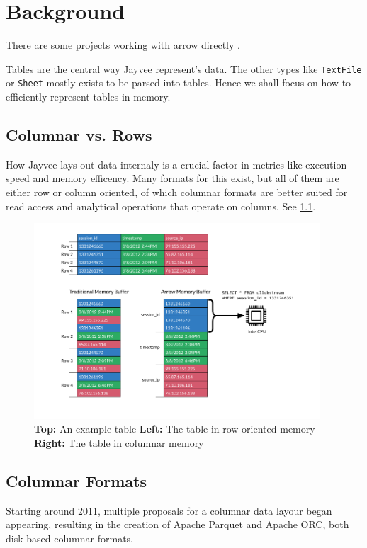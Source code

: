 \chapter{Background}
\label{chapter:Literature}

There are some projects working with arrow directly
\autocite{Ahmad2020}
\autocite{Peltenburg2021}
\autocite{Grossman2022}. %

Tables are the central way Jayvee represent's data.
The other types like \Verb|TextFile| or \Verb|Sheet| mostly exists to be parsed into tables.
Hence %
we shall focus on how to efficiently represent tables in memory.

\section{Columnar vs. Rows}
\label{section:column_vs_row}
How Jayvee lays out data internaly is a crucial factor in metrics like execution speed and memory efficency.
Many formats for this exist, but all of them are either row or column oriented, of which columnar formats are better suited for read access and analytical operations that operate on columns. \autocite{Floratou2019}
See \ref{fig:row_v_col}.
\begin{figure}
	\begin{center}
		\includegraphics[width=0.95\textwidth]{resources/columnar}
	\end{center}
	\caption{\textbf{Top:} An example table \textbf{Left:} The table in row oriented memory \textbf{Right:} The table in columnar memory}
	\label{fig:row_v_col}
\end{figure}


\section{Columnar Formats}
\label{section:columnar}
Starting around 2011, multiple proposals for a columnar data layour began appearing, resulting in the creation of Apache Parquet and Apache ORC, both disk-based columnar formats.

